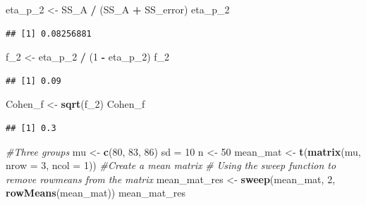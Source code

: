 \documentclass[]{book}
\newenvironment{Shaded}{\begin{snugshade}}{\end{snugshade}}
\newcommand{\CommentTok}[1]{\textcolor[rgb]{0.56,0.35,0.01}{\textit{#1}}}
\newcommand{\DataTypeTok}[1]{\textcolor[rgb]{0.13,0.29,0.53}{#1}}
\newcommand{\DecValTok}[1]{\textcolor[rgb]{0.00,0.00,0.81}{#1}}
\newcommand{\KeywordTok}[1]{\textcolor[rgb]{0.13,0.29,0.53}{\textbf{#1}}}
\newcommand{\NormalTok}[1]{#1}
\newcommand{\OperatorTok}[1]{\textcolor[rgb]{0.81,0.36,0.00}{\textbf{#1}}}
\newcommand{\StringTok}[1]{\textcolor[rgb]{0.31,0.60,0.02}{#1}}
\begin{document}
\begin{Shaded}
\begin{Highlighting}[]
\NormalTok{eta_p_}\DecValTok{2}\NormalTok{ <-}\StringTok{ }\NormalTok{SS_A }\OperatorTok{/}\StringTok{ }\NormalTok{(SS_A }\OperatorTok{+}\StringTok{ }\NormalTok{SS_error)}
\NormalTok{eta_p_}\DecValTok{2}
\end{Highlighting}
\end{Shaded}

\begin{verbatim}
## [1] 0.08256881
\end{verbatim}

\begin{Shaded}
\begin{Highlighting}[]
\NormalTok{f_}\DecValTok{2}\NormalTok{ <-}\StringTok{ }\NormalTok{eta_p_}\DecValTok{2} \OperatorTok{/}\StringTok{ }\NormalTok{(}\DecValTok{1} \OperatorTok{-}\StringTok{ }\NormalTok{eta_p_}\DecValTok{2}\NormalTok{)}
\NormalTok{f_}\DecValTok{2}
\end{Highlighting}
\end{Shaded}

\begin{verbatim}
## [1] 0.09
\end{verbatim}

\begin{Shaded}
\begin{Highlighting}[]
\NormalTok{Cohen_f <-}\StringTok{ }\KeywordTok{sqrt}\NormalTok{(f_}\DecValTok{2}\NormalTok{)}
\NormalTok{Cohen_f}
\end{Highlighting}
\end{Shaded}

\begin{verbatim}
## [1] 0.3
\end{verbatim}

\begin{Shaded}
\begin{Highlighting}[]
\CommentTok{#Three groups}
\NormalTok{mu <-}\StringTok{ }\KeywordTok{c}\NormalTok{(}\DecValTok{80}\NormalTok{, }\DecValTok{83}\NormalTok{, }\DecValTok{86}\NormalTok{)}
\NormalTok{sd =}\StringTok{ }\DecValTok{10}
\NormalTok{n <-}\StringTok{ }\DecValTok{50}
\NormalTok{mean_mat <-}\StringTok{ }\KeywordTok{t}\NormalTok{(}\KeywordTok{matrix}\NormalTok{(mu,}
\DataTypeTok{nrow =} \DecValTok{3}\NormalTok{,}
\DataTypeTok{ncol =} \DecValTok{1}\NormalTok{)) }\CommentTok{#Create a mean matrix}
\CommentTok{# Using the sweep function to remove rowmeans from the matrix}
\NormalTok{mean_mat_res <-}\StringTok{ }\KeywordTok{sweep}\NormalTok{(mean_mat, }\DecValTok{2}\NormalTok{, }\KeywordTok{rowMeans}\NormalTok{(mean_mat))}
\NormalTok{mean_mat_res}
\end{Highlighting}
\end{Shaded}
\end{document}
